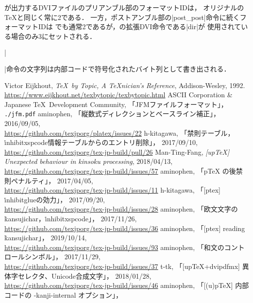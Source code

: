\documentclass[a4paper,11pt,nomag,dvipdfmx]{jsarticle}
\begin{document}
\pTeX が出力するDVIファイルのプリアンブル部のフォーマットIDは，
オリジナルの\TeX と同じく常に2である．
一方，ポストアンブル部の|post_post|命令に続くフォーマットIDは
\pTeX でも通常2であるが，\pTeX の拡張DVI命令である|dir|が
使用されている場合のみ3にセットされる．

|\special|命令の文字列は内部コードで符号化されたバイト列として書き出される．

\begin{thebibliography}{99}
  Victor Eijkhout, \textit{\TeX\ by Topic, A \TeX nician's Reference},
  Addison-Wesley, 1992.\\
  \url{https://www.eijkhout.net/texbytopic/texbytopic.html}
  ASCII Corporation \& Japanese \TeX\ Development Community, 「JFMファイルフォーマット」，
  \texttt{./jfm.pdf}
  aminophen, 「縦数式ディレクションとベースライン補正」，
  2016/09/05,\\
  \url{https://github.com/texjporg/platex/issues/22}
  h-kitagawa, 「禁則テーブル，\.{inhibitxspcode}情報テーブルからのエントリ削除」，
  2017/09/10,\\
  \url{https://github.com/texjporg/tex-jp-build/pull/26}
  Man-Ting-Fang, \textit{[upTeX] Unexpected behaviour in kinsoku processing},
  2018/04/13,\\
  \url{https://github.com/texjporg/tex-jp-build/issues/57}
  aminophen, 「pTeX の後禁則ペナルティ」，
  2017/04/05,\\
  \url{https://github.com/texjporg/tex-jp-build/issues/11}
  h-kitagawa, 「[ptex] \.{inhibitglue}の効力」，
  2017/09/20,\\
  \url{https://github.com/texjporg/tex-jp-build/issues/28}
  aminophen, 「欧文文字の\.{kansujichar}，\.{inhibitxspcode}」，
  2017/11/26,\\
  \url{https://github.com/texjporg/tex-jp-build/issues/36}
  aminophen, 「[ptex] reading \.{kansujichar}」，
  2019/10/14,\\
  \url{https://github.com/texjporg/tex-jp-build/issues/93}
  aminophen, 「和文のコントロールシンボル」，
  2017/11/29,\\
  \url{https://github.com/texjporg/tex-jp-build/issues/37}
  t-tk, 「[upTeX+dvipdfmx] 異体字セレクタ、Unicode合成文字」，
  2018/01/28,\\
  \url{https://github.com/texjporg/tex-jp-build/issues/46}
  aminophen, 「[(u)pTeX] 内部コードの -kanji-internal オプション」，

\end{thebibliography}
\end{document}

